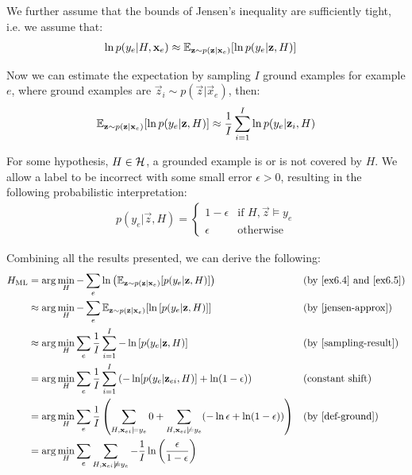 We further assume that the bounds of Jensen's inequality are sufficiently tight, i.e. we assume that:
\begin{align}
\ln p(y_e|H, \textbf{x}_e)
&\approx \mathbb{E}_{\textbf{z} \sim p(\textbf{z}| \textbf{x}_e)}[\ln  p(y_e|\textbf{z},H)] \label{jensen-approx}
\end{align}

Now we can estimate the expectation by sampling $I$ ground examples for example $e$, where ground examples are $\vec{z}_{i} \sim p(\vec{z}| \vec{x}_e)$, then:
\begin{align}
\mathbb{E}_{\textbf{z} \sim p(\textbf{z}| \textbf{x}_e)}[\ln  p(y_e|\textbf{z},H)]
\approx \frac{1}{I} \sum_{i=1}^{I} \ln  p(y_e|\textbf{z}_i,H) \label{sampling-result}
\end{align}


For some hypothesis, $H\in \mathcal{H}$, a grounded example is or is not covered by $H$. We allow a label to be incorrect with some small error $\epsilon > 0$, resulting in the following probabilistic interpretation:
\begin{align}
p(y_e | \vec{z}, H) =
\begin{cases}
1 - \epsilon & \text{if } H, \vec{z} \models y_e \\
\epsilon & \text{otherwise}
\label{def-ground}
\end{cases}
\end{align}

Combining all the results presented, we can derive the following:
\begin{align}
H_{\text{ML}}
& = \arg\min_{H} 
-\sum_e \ln \left( \mathbb{E}_{\textbf{z} \sim p(\textbf{z}| \textbf{x}_e)}[p(y_e|\textbf{z},H)] \right ) 
&& \text{(by \ref{ex6.4} and \ref{ex6.5})} \nonumber \\
& \approx \arg\min_{H}
-\sum_e \mathbb{E}_{\textbf{z} \sim p(\textbf{z}| \textbf{x}_e)}[\ln \left[ p(y_e|\textbf{z},H) \right ]]  
&& \text{(by \ref{jensen-approx})} \nonumber \\
& \approx \arg\min_{H}
\sum_e \frac{1}{I} \sum_{i=1}^I -\ln \left[ p(y_e|\textbf{z},H) \right ]
&& \text{(by \ref{sampling-result})} \nonumber \\
& = \arg\min_{H} \sum_e \frac{1}{I} \sum_{i=1}^I  \left(-\ln  [p(y_e|\textbf{z}_{ei},H)] + \ln (1-\epsilon) \right)
&& \text{(constant shift)} \nonumber \\
& = \arg\min_{H}
\sum_e \frac{1}{I} 
\left (
\sum_{H,\textbf{x}_{ei}\models y_e} 0
+
\sum_{H,\textbf{x}_{ei}\not\models y_e} (-\ln \epsilon + \ln (1 - \epsilon))
\right ) 
&& \text{(by \ref{def-ground})} \nonumber \\
& = \arg\min_{H}
\sum_e  
\sum_{H,\textbf{x}_{ei}\not\models y_e} -\frac{1}{I}\ln \left ( \frac{\epsilon}{1 - \epsilon} \right ) \label{eq-final-no-int}
\end{align}


